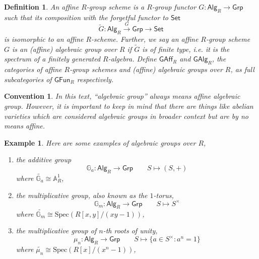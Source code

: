 \documentclass[10pt]{book}
\theoremstyle{bookplain}
\theoremstyle{bookdefinition}
\newtheorem{definition}[theorem]{Definition}
\newtheorem{example}[theorem]{Example}
\theoremstyle{bookremark}
\newtheorem{convention}[theorem]{Convention}
\begin{document}
\begin{definition}
    An \textit{affine $R$-group scheme} is a $R$-group functor $G:\mathsf{Alg}_R\rightarrow\mathsf{Grp}$ such that 
    its composition with the forgetful functor to $\mathsf{Set}$
    \[\widetilde{G}:\mathsf{Alg}_R\xrightarrow{G} \mathsf{Grp}\rightarrow\mathsf{Set}\]
    is isomorphic to an affine $R$-scheme. Further, we say an affine $R$-group scheme $G$ is an \textit{(affine) algebraic group} over $R$ if $\widetilde{G}$ is \textit{of finite type}, i.e. it is the spectrum of a finitely generated $R$-algebra. Define $\mathsf{GAff}_R$ and $\mathsf{GAlg}_R$, the categories of affine $R$-group schemes and (affine) algebraic groups over $R$, as full subcategories of $\mathsf{GFun}_R$ respectively. 
\end{definition}
\begin{convention}
    In this text, ``algebraic group'' always means affine algebraic group. However, it is important to keep in mind that there are things like abelian varieties which are considered algebraic groups in broader context but are by no means affine.
\end{convention}
\begin{example}Here are some examples of algebraic groups over $R$,
    \begin{enumerate}
        \item the \textit{additive group}
        \[\mathbb G_a:\mathsf{Alg}_R\rightarrow\mathsf{Grp}\qquad S\mapsto (S,+)\]
        where $\widetilde{\mathbb G_a}\cong \mathbb A^1_R$,
        \item the \textit{multiplicative group}, also known as the \textit{$1$-torus},
        \[\mathbb G_m:\mathsf{Alg}_R\rightarrow\mathsf{Grp}\qquad S\mapsto S^\times\]
        where $\widetilde{\mathbb G_m}\cong \mathrm{Spec}(R[x,y]/(xy-1))$,
        \item the \textit{multiplicative group of $n$-th roots of unity},
        \[\mu_n:\mathsf{Alg}_R\rightarrow\mathsf{Grp}\qquad S\mapsto \{a\in S^\times:a^n=1\}\]
        where $\widetilde{\mu_n}\cong \mathrm{Spec}(R[x]/(x^n-1))$,
    \end{enumerate}
\end{example}
\end{document}
